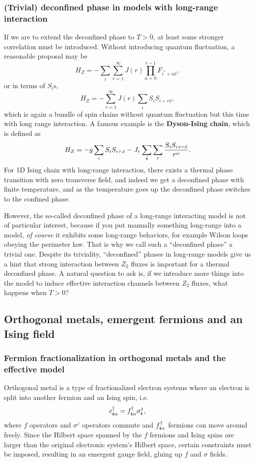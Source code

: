 \documentclass[hyperref, a4paper]{article}
\newcommand*{\concept}[1]{{\textbf{#1}}}
\newcommand*{\Ztwo}{\texorpdfstring{$\mathbb{Z}_2$ }{Z2 }}
\def\mathbb#1{#1}%
\begin{document}
\subsubsection{(Trivial) deconfined phase in models with long-range interaction}

If we are to extend the deconfined phase to $T>0$, at least some stronger correlation must be introduced.
Without introducing quantum fluctuation, a reasonable proposal may be 
\[
    H_Z = - \sum_i \sum_{r=1}^\infty J(r) \prod_{a=0}^{r-1} F_{i^*+a \hat{x}},
\]
or in terms of $S_i$s,
\[
    H_Z = - \sum_{r=1}^\infty J(r) \sum_i S_i S_{i + r \hat{x}} ,
\]
which is again a bundle of spin chains without quantum fluctuation but this time with long range interaction.
A famous example is the \concept{Dyson-Ising chain}, which is defined as
\[
    H_Z = - g \sum_i S_i S_{i+\hat{x}} - J_r \sum_{\vb*{i}} \sum_r \frac{S_i S_{i + r \hat{x}}}{r^\omega}.
\]
For 1D Ising chain with long-range interaction, there exists a thermal phase transition with zero transverse field, and indeed we get a deconfined phase with finite temperature, and as the temperature goes up the deconfined phase switches to the confined phase.

However, the so-called deconfined phase of a long-range interacting model is not of particular interest, because if you put manually something long-range into a model, \emph{of course} it exhibits some long-range behaviors, for example Wilson loops obeying the perimeter law.
That is why we call such a ``deconfined phase'' a trivial one.
Despite its triviality, ``deconfined'' phases in long-range models give us a hint that strong interaction between \Ztwo fluxes is important for a thermal deconfined phase.
A natural question to ask is, if we introduce more things into the model to induce effective interaction channels between \Ztwo fluxes, what happens when $T > 0$?

\subsection{Orthogonal metals, emergent fermions and an Ising field}

\subsubsection{Fermion fractionalization in orthogonal metals and the effective model}

Orthogonal metal is a type of fractionalized electron systems where an electron is split into another fermion and an Ising spin, i.e.
\begin{equation}
    c^\dagger_{\vb*{i} \alpha} = f^\dagger_{\vb*{i} \alpha} \sigma^z_{\vb*{i}}, 
    \label{eq:orthogonal-metal-ansatz}
\end{equation}
where $f$ operators and $\sigma^z$ operators commute and $f^\dagger_{\vb*{i} \alpha}$ fermions can move around freely. 
Since the Hilbert space spanned by the $f$ fermions and Ising spins are larger than the original electronic system's Hilbert space, certain constraints must be imposed, resulting in an emergent gauge field, gluing up $f$ and $\sigma$ fields.
\end{document}
